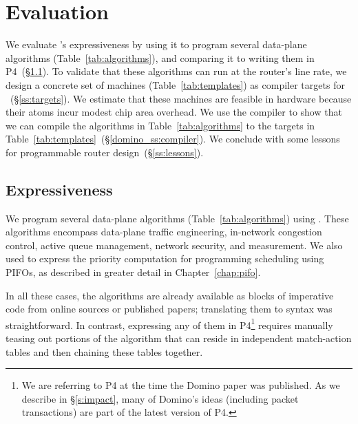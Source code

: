 \section{Evaluation}
\label{s:eval}


We evaluate \pktlanguage's expressiveness by using it to program several
data-plane algorithms (Table~\ref{tab:algorithms}), and comparing it to writing
them in P4~(\S\ref{ss:expressiveness}). To validate that these algorithms can
run at the router's line rate, we design a concrete set of \absmachine machines
(Table~\ref{tab:templates}) as compiler targets for
\pktlanguage~(\S\ref{ss:targets}).  We estimate that these machines are
feasible in hardware because their atoms incur modest chip area overhead.  We
use the \pktlanguage compiler to show that we can compile the algorithms in
Table~\ref{tab:algorithms} to the targets in
Table~\ref{tab:templates}~(\S\ref{domino_ss:compiler}).  We conclude with some
lessons for programmable router design~(\S\ref{ss:lessons}).

\subsection{Expressiveness}
\label{ss:expressiveness}

We program several data-plane algorithms (Table~\ref{tab:algorithms}) using
\pktlanguage. These algorithms encompass data-plane traffic engineering,
in-network congestion control, active queue management, network security, and
measurement. We also used \pktlanguage to express the priority computation for
programming scheduling using PIFOs, as described in greater
detail in Chapter~\ref{chap:pifo}.

In all these cases, the algorithms are already available as blocks of
imperative code from online sources or published papers; translating them to
\pktlanguage syntax was straightforward. In contrast, expressing any of them in
P4\footnote{We are referring to P4 at the time the Domino paper was published.
As we describe in \S\ref{s:impact}, many of Domino's ideas (including packet
transactions) are part of the latest version of P4.} requires manually teasing
out portions of the algorithm that can reside in independent match-action
tables and then chaining these tables together.

